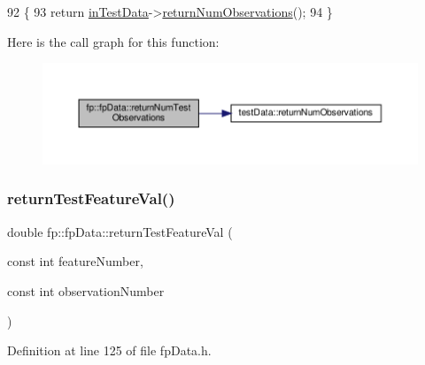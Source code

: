 \begin{DoxyCode}
92                                       \{
93                 \textcolor{keywordflow}{return} \hyperlink{classfp_1_1fpData_ad4f4dd3a8d15633b7f983932fa60bbad}{inTestData}->\hyperlink{classtestData_a7b7ea4d5b03144b691e909730d70ce62}{returnNumObservations}();
94             \}
\end{DoxyCode}
Here is the call graph for this function\+:\nopagebreak
\begin{figure}[H]
\begin{center}
\leavevmode
\includegraphics[width=350pt]{classfp_1_1fpData_a9a115d29fafb6e5b941f4e0c860e65e7_cgraph}
\end{center}
\end{figure}
\mbox{\label{classfp_1_1fpData_a42f76961f1649e329d654e9e1bb13fc6}} 
\subsubsection{\texorpdfstring{return\+Test\+Feature\+Val()}{returnTestFeatureVal()}}
{\footnotesize\ttfamily double fp\+::fp\+Data\+::return\+Test\+Feature\+Val (\begin{DoxyParamCaption}\item[{const int}]{feature\+Number,  }\item[{const int}]{observation\+Number }\end{DoxyParamCaption})\hspace{0.3cm}{\ttfamily [inline]}}



Definition at line 125 of file fp\+Data.\+h.


